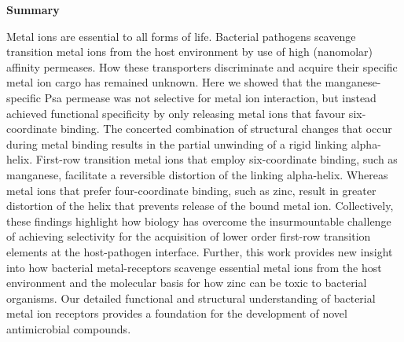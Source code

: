 \textbf{Summary}

Metal ions are essential to all forms of life. Bacterial pathogens scavenge transition metal ions from the host environment by use of high (nanomolar) affinity permeases. How these transporters discriminate and acquire their specific metal ion cargo has remained unknown. Here we showed that the manganese-specific Psa permease was not selective for metal ion interaction, but instead achieved functional specificity by only releasing metal ions that favour six-coordinate binding. The concerted combination of structural changes that occur during metal binding results in the partial unwinding of a rigid linking alpha-helix. First-row transition metal ions that employ six-coordinate binding, such as manganese, facilitate a reversible distortion of the linking alpha-helix. Whereas metal ions that prefer four-coordinate binding, such as zinc, result in greater distortion of the helix that prevents release of the bound metal ion. Collectively, these findings highlight how biology has overcome the insurmountable challenge of achieving selectivity for the acquisition of lower order first-row transition elements at the host-pathogen interface.  Further, this work provides new insight into how bacterial metal-receptors scavenge essential metal ions from the host environment and the molecular basis for how zinc can be toxic to bacterial organisms. Our detailed functional and structural understanding of bacterial metal ion receptors provides a foundation for the development of novel antimicrobial compounds. 